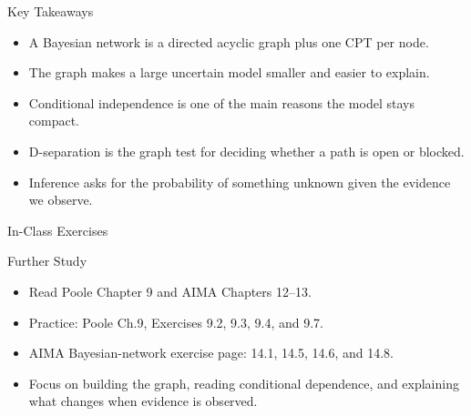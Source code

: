 \documentclass[aspectratio=169]{beamer}
\begin{document}
\begin{frame}{Key Takeaways}
\begin{itemize}
  \item A Bayesian network is a directed acyclic graph plus one CPT per node.
  \item The graph makes a large uncertain model smaller and easier to explain.
  \item Conditional independence is one of the main reasons the model stays compact.
  \item D-separation is the graph test for deciding whether a path is open or blocked.
  \item Inference asks for the probability of something unknown given the evidence we observe.
\end{itemize}
\end{frame}

\begin{frame}{In-Class Exercises}
\end{frame}

\begin{frame}{Further Study}
\begin{itemize}
  \item Read Poole Chapter 9 and AIMA Chapters 12--13.
  \item Practice: Poole Ch.9, Exercises 9.2, 9.3, 9.4, and 9.7.
  \item AIMA Bayesian-network exercise page: 14.1, 14.5, 14.6, and 14.8.
  \item Focus on building the graph, reading conditional dependence, and explaining what changes when evidence is observed.
\end{itemize}
\end{frame}
\end{document}
